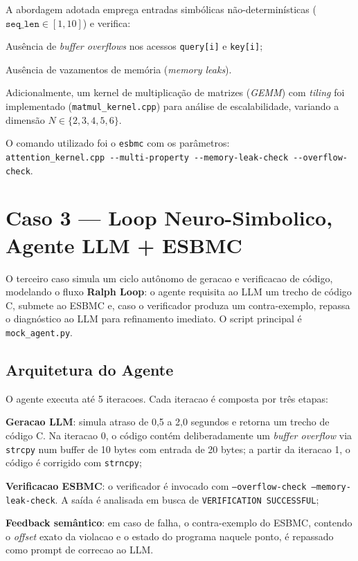 A abordagem adotada emprega entradas simbólicas não-determinísticas ($\texttt{seq\_len} \in [1, 10]$) e verifica:
\begin{alineas}
    \item Ausência de \textit{buffer overflows} nos acessos \texttt{query[i]} e \texttt{key[i]};
    \item Ausência de vazamentos de memória (\textit{memory leaks}).
\end{alineas}

Adicionalmente, um kernel de multiplicação de matrizes (\textit{GEMM}) com \textit{tiling} foi implementado (\texttt{matmul\_kernel.cpp}) para análise de escalabilidade, variando a dimensão $N \in \{2, 3, 4, 5, 6\}$.

O comando utilizado foi o \texttt{esbmc} com os parâmetros: \\
\texttt{attention\_kernel.cpp -{}-multi-property -{}-memory-leak-check -{}-overflow-check}.

\section{Caso 3 --- Loop Neuro-Simbolico, Agente LLM + ESBMC}

O terceiro caso simula um ciclo aut\^{o}nomo de geracao e verificacao de c\'{o}digo, modelando o fluxo \textbf{Ralph Loop}: o agente requisita ao LLM um trecho de c\'{o}digo C, submete ao ESBMC e, caso o verificador produza um contra-exemplo, repassa o diagn\'{o}stico ao LLM para refinamento imediato. O script principal \'{e} \texttt{mock\_agent.py}.

\subsection{Arquitetura do Agente}

O agente executa at\'{e} 5 iteracoes. Cada iteracao \'{e} composta por tr\^{e}s etapas:

\begin{alineas}
    \item \textbf{Geracao LLM}: simula atraso de 0,5 a 2,0 segundos e retorna um trecho de c\'{o}digo C. Na iteracao 0, o c\'{o}digo cont\'{e}m deliberadamente um \textit{buffer overflow} via \texttt{strcpy} num buffer de 10 bytes com entrada de 20 bytes; a partir da iteracao 1, o c\'{o}digo \'{e} corrigido com \texttt{strncpy};
    \item \textbf{Verificacao ESBMC}: o verificador \'{e} invocado com \texttt{--overflow-check --memory-leak-check}. A sa\'{i}da \'{e} analisada em busca de \texttt{VERIFICATION SUCCESSFUL};
    \item \textbf{Feedback sem\^{a}ntico}: em caso de falha, o contra-exemplo do ESBMC, contendo o \textit{offset} exato da violacao e o estado do programa naquele ponto, \'{e} repassado como prompt de correcao ao LLM.
\end{alineas}

